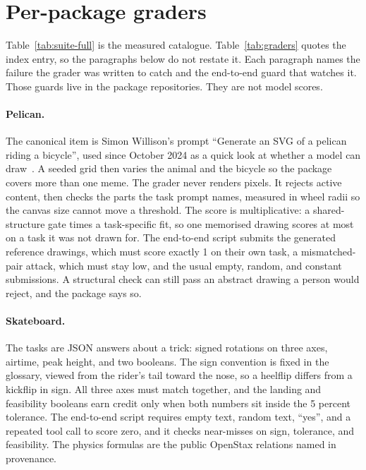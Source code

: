 \section{Per-package graders}
\label{app:suite}

Table~\ref{tab:suite-full} is the measured catalogue. Table~\ref{tab:graders} quotes the index entry, so the paragraphs below do not restate it. Each paragraph names the failure the grader was written to catch and the end-to-end guard that watches it. Those guards live in the package repositories. They are not model scores.

\paragraph{Pelican.}
The canonical item is Simon Willison's prompt ``Generate an SVG of a pelican riding a bicycle'', used since October 2024 as a quick look at whether a model can draw~\cite{willison2024pelican}. A seeded grid then varies the animal and the bicycle so the package covers more than one meme. The grader never renders pixels. It rejects active content, then checks the parts the task prompt names, measured in wheel radii so the canvas size cannot move a threshold. The score is multiplicative: a shared-structure gate times a task-specific fit, so one memorised drawing scores at most \notePelicanMemoCap{} on a task it was not drawn for. The end-to-end script submits the generated reference drawings, which must score exactly 1 on their own task, a mismatched-pair attack, which must stay low, and the usual empty, random, and constant submissions. A structural check can still pass an abstract drawing a person would reject, and the package says so.

\paragraph{Skateboard.}
The tasks are JSON answers about a trick: signed rotations on three axes, airtime, peak height, and two booleans. The sign convention is fixed in the glossary, viewed from the rider's tail toward the nose, so a heelflip differs from a kickflip in sign. All three axes must match together, and the landing and feasibility booleans earn credit only when both numbers sit inside the 5 percent tolerance. The end-to-end script requires empty text, random text, ``yes'', and a repeated tool call to score zero, and it checks near-misses on sign, tolerance, and feasibility. The physics formulas are the public OpenStax relations named in provenance.

